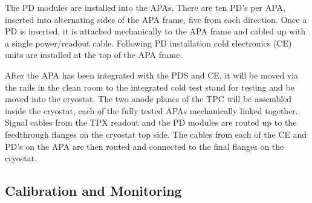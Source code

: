 The PD modules are installed into the APAs. There are ten PD’s per APA, inserted into alternating sides of the APA frame, five from each direction. Once a PD is inserted, it is attached mechanically to the APA frame  and cabled up with a single power/readout cable. Following PD installation cold electronics (CE) units are installed at the top of the APA frame.

After the APA has been integrated with the PDS and CE, it will be moved via the rails in the clean room to the integrated cold test stand for testing and be moved into the cryostat. The two anode planes of the TPC will be assembled inside the cryostat, each of the fully tested APAs mechanically linked together. Signal cables from the TPX readout and the PD modules are routed up to the feedthrough flanges on the cryostat top side. The cables from each of the CE and PD’s on the APA are then routed and connected to the final flanges on the cryostat.


\subsection{Calibration and Monitoring}
\label{sec:fdsp-pd-install-calib}



